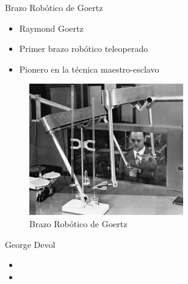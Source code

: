 

\begin{frame}[fragile]{Brazo Robótico de Goertz}
\vspace{10px}
\pause
{}
\begin{block}{}
	\begin{itemize}
		\item Raymond Goertz
		\pause
		\item Primer brazo robótico teleoperado
		\pause
		\item Pionero en la técnica maestro-esclavo
	\end{itemize}
\end{block}
\begin{figure}
		\centering
		\includegraphics[scale=3.5]{./EtapaPrimeriza/imagenes/brazo.jpg}
		\caption{Brazo Robótico de Goertz}
\end{figure}
\end{frame}




\begin{frame}[fragile]{George Devol}
\vspace{10px}
\pause
{}
\begin{block}{}
	\begin{itemize}
		\item 
		\pause
		\item 
	\end{itemize}
\end{block}
\end{frame}


